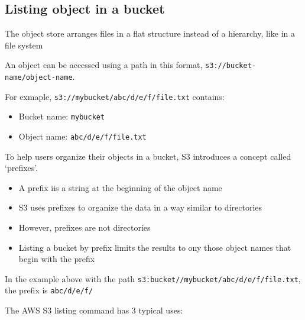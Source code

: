 \documentclass{report}
\theoremstyle{definition}
\let\oldsubsection\subsection
\renewcommand{\subsection}{\oldsubsection*}
\begin{document}
\subsection{Listing object in a bucket}
The object store arranges files in a flat structure instead of a hierarchy, like in a file system

An object can be accessed using a path in this format, \lstinline|s3://bucket-name/object-name|.

For exmaple, \lstinline|s3://mybucket/abc/d/e/f/file.txt| contains:

\begin{itemize}
\item
Bucket name: \lstinline|mybucket|
\item
Object name: \lstinline|abc/d/e/f/file.txt|
\end{itemize}

To help users organize their objects in a bucket, S3 introduces a concept called `prefixes'.

\begin{itemize}
\item
A prefix iis a string at the beginning of the object name
\item
S3 uses prefixes to organize the data in a way similar to directories
\item
However, prefixes are not directories
\item
Listing a bucket by prefix limits the results to ony those object names that begin with the prefix
\end{itemize}

In the example above with the path \lstinline|s3:bucket//mybucket/abc/d/e/f/file.txt|, the prefix is \lstinline|abc/d/e/f/|

The AWS S3 listing command has 3 typical uses:
\end{document}
